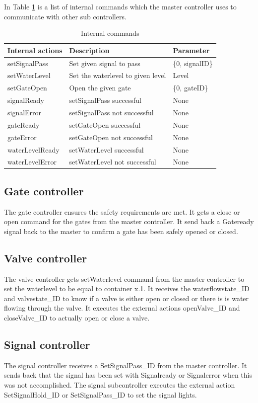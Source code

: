 In Table \ref{tab:internal} is a list of internal commands which the master controller uses to communicate with other sub controllers.

\begin{table}[htbp]
	\centering
	\caption{Internal commands}
	\begin{tabular}{lll}
		\toprule
		\textbf{Internal actions} & \textbf{Description} & \textbf{Parameter} \\
		\midrule
		setSignalPass & Set given signal to pass & \{0, signalID\} \\
		setWaterLevel & Set the waterlevel to given level & Level\\
		setGateOpen & Open the given gate & \{0, gateID\} \\
		signalReady & setSignalPass successful & None\\
		signalError & setSignalPass not successful & None \\
		gateReady & setGateOpen successful & None\\
		gateError & setGateOpen not successful & None\\
		waterLevelReady & setWaterLevel successful & None\\
		waterLevelError & setWaterLevel not successful & None\\
		\bottomrule
	\end{tabular}%
	\label{tab:internal}%
\end{table}%


\subsection{Gate controller}
The gate controller ensures the safety requirements are met. It gets a close or open command for the gates from the master controller. It send back a Gateready signal back to the master to confirm a gate has been safely opened or closed. 
\subsection{Valve controller}
The valve controller gets setWaterlevel command from the master controller to set the waterlevel to be equal to container x.1. It receives the waterflowstate\_ID and valvestate\_ID to know if a valve is either open or closed or there is is water flowing through the valve. It executes the external actions openValve\_ID and closeValve\_ID to actually open or close a valve.  
\subsection{Signal controller}
The signal controller receives a SetSignalPass\_ID from the master controller. It sends back that the signal has been set with Signalready or Signalerror when this was not accomplished. The signal subcontroller executes the external action SetSignalHold\_ID or SetSignalPass\_ID to set the signal lights. 

